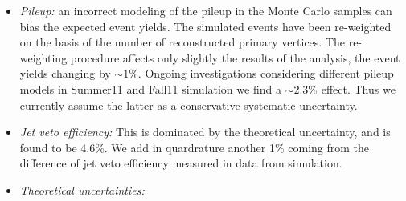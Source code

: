 \begin{itemize}
  \begin{itemize}
  \item Jet induced backgrounds, $\Wjets$ and $QCD$: the associated systematic
    uncertainty is 36\%.
  \item Top background: this background is estimated using $b$-tagged events and
    the $b$-tagging efficiency, which is measured in control regions in data.
    The associated systematic uncertainties are below $5\%$,
    while the statistical component is about $25\%$ for $\intlumi$.
  \item Drell-Yan background: The uncertainty arises from the limited knowledge of
    events with large $\met$ tails.
    We conservatively quantify such uncertainty from the variation of the ratio $R_{out/in}$
    (Eq.\ref{eq:dyest}) as a function of the $\met$ requirement,
    leading to an estimate of about $43\%$.
  \item Other backgrounds: The sub-dominant backgrounds are estimated from simulation
    with appropriate systematic uncertainties on their cross section.
    The theoretical uncertainties on the $\WZ$ and $\ZZ$ are estimated the same way as in the signal detailed in below. 
    These uncertainties must be augmented by the luminosity normalization uncertainty.
  \end{itemize}

\item {\it Pileup:} an incorrect modeling of the pileup in the Monte Carlo samples
can bias the expected event yields. The simulated events have been re-weighted
on the basis of the number of reconstructed
primary vertices. The re-weighting procedure affects only slightly the results of the analysis,
the event yields changing by $\sim1\%$. Ongoing investigations considering 
different pileup models in Summer11 and Fall11 simulation we find a $\sim2.3\%$ effect.  
Thus we currently assume the latter as a conservative systematic uncertainty.

\item {\it Jet veto efficiency:}
This is dominated by the theoretical uncertainty, and is found to be 4.6\%. We add in 
quardrature another 1\% coming from the difference of jet veto efficiency measured in data 
from simulation. 

\item {\it Theoretical uncertainties:}


\end{itemize}
